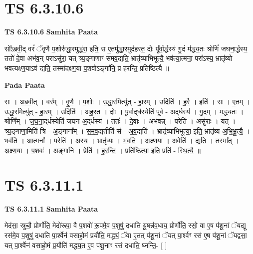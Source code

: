 \documentclass[17pt]{extarticle}
\begin{document}

\section{ TS 6.3.10.6 }

\textbf{TS 6.3.10.6 } \newline
\textbf{Samhita Paata} \newline

सो᳚ऽब्रवी॒द् वरं॑ ॅवृणै प॒शोरु॑द्धा॒रमुद्ध॑रा॒ इति॒ स ए॒तमु॑द्धा॒रमुद॑हरत॒ दोः पू᳚र्वा॒र्द्धस्य॑ गु॒दं म॑द्ध्य॒तः श्रोणिं॑ जघना॒र्द्धस्य॒ ततो॑ दे॒वा अभ॑व॒न् पराऽसु॑रा॒ यत् त्र्य॒ङ्गाणाꣳ॑ समव॒द्यति॒ भ्रातृ॑व्याभिभूत्यै॒ भव॑त्या॒त्मना॒ परा᳚ऽस्य॒ भ्रातृ॑व्यो भवत्यक्ष्ण॒याऽव॑ द्यति॒ तस्मा॑दक्ष्ण॒या प॒शवोऽङ्गा॑नि॒ प्र ह॑रन्ति॒ प्रति॑ष्ठित्यै ॥ \newline

\textbf{Pada Paata} \newline

सः । अ॒ब्र॒वी॒त् । वर᳚म् । वृ॒णै॒ । प॒शोः । उ॒द्धा॒रमित्यु॑त् - हा॒रम् । उदिति॑ । ह॒रै॒ । इति॑ । सः । ए॒तम् । उ॒द्धा॒रमित्यु॑त् - हा॒रम् । उदिति॑ । अ॒ह॒र॒त॒ । दोः । पू॒र्वा॒द्‌र्धस्येति॑ पूर्व - अ॒द्‌र्धस्य॑ । गु॒दम् । म॒द्ध्य॒तः । श्रोणि᳚म् । ज॒घ॒ना॒द्‌र्धस्येति॑ जघन-अ॒द्‌र्धस्य॑ । ततः॑ । दे॒वाः । अभ॑वन्न् । परेति॑ । असु॑राः । यत् । त्र्य॒ङ्गाणा॒मिति॑ त्रि - अ॒ङ्गाना᳚म् । स॒म॒व॒द्यतीति॑ सं - अ॒व॒द्यति॑ । भ्रातृ॑व्याभिभूत्या॒ इति॒ भ्रातृ॑व्य-अ॒भि॒भू॒त्यै॒ । भव॑ति । आ॒त्मना᳚ । परेति॑ । अ॒स्य॒ । भ्रातृ॑व्यः । भ॒व॒ति॒ । अ॒क्ष्ण॒या । अवेति॑ । द्य॒ति॒ । तस्मा᳚त् । अ॒क्ष्ण॒या । प॒शवः॑ । अङ्गा॑नि । प्रेति॑ । ह॒र॒न्ति॒ । प्रति॑ष्ठित्या॒ इति॒ प्रति॑ - स्थि॒त्यै॒ ॥  \newline





\section{ TS 6.3.11.1 }

\textbf{TS 6.3.11.1 } \newline
\textbf{Samhita Paata} \newline

मेद॑सा॒ स्रुचौ॒ प्रोर्णो॑ति॒ मेदो॑रूपा॒ वै प॒शवो॑ रू॒पमे॒व प॒शुषु॑ दधाति यू॒षन्न॑व॒धाय॒ प्रोर्णो॑ति॒ रसो॒ वा ए॒ष प॑शू॒नां ॅयद्यू रस॑मे॒व प॒शुषु॑ दधाति पा॒र्श्वेन॑ वसाहो॒मं प्रयौ॑ति॒ मद्ध्यं॒ ॅवा ए॒तत् प॑शू॒नां ॅयत् पा॒र्श्वꣳ रस॑ ए॒ष प॑शू॒नां ॅयद्वसा॒ यत् पा॒र्श्वेन॑ वसाहो॒मं प्र॒यौति॑ मद्ध्य॒त ए॒व प॑शू॒नाꣳ रसं॑ दधाति॒ घ्नन्ति॒- [  ] \newline
\end{document}

